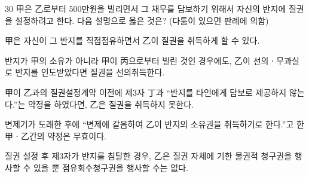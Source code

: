 \begin{question}{30}
甲은 乙로부터 500만원을 빌리면서 그 채무를 담보하기 위해서 자신의 반지에 질권을 설정하려고 한다. 다음 설명으로 옳은 것은? (다툼이 있으면 판례에 의함)
\begin{choices}
  \item 甲은 자신이 그 반지를 직접점유하면서 乙이 질권을 취득하게 할 수 있다.
  \item 반지가 甲의 소유가 아니라 甲이 丙으로부터 빌린 것인 경우에도, 乙이 선의ㆍ무과실로 반지를 인도받았다면 질권을 선의취득한다.
  \item 甲이 乙과의 질권설정계약 이전에 제3자 丁과 “반지를 타인에게 담보로 제공하지 않는다.”는 약정을 하였다면, 乙은 질권을 취득하지 못한다.
  \item 변제기가 도래한 후에 “변제에 갈음하여 乙이 반지의 소유권을 취득하기로 한다.”고 한 甲ㆍ乙간의 약정은 무효이다.
  \item 질권 설정 후 제3자가 반지를 침탈한 경우, 乙은 질권 자체에 기한 물권적 청구권을 행사할 수 있을 뿐 점유회수청구권을 행사할 수는 없다.
\end{choices}
\end{question}

